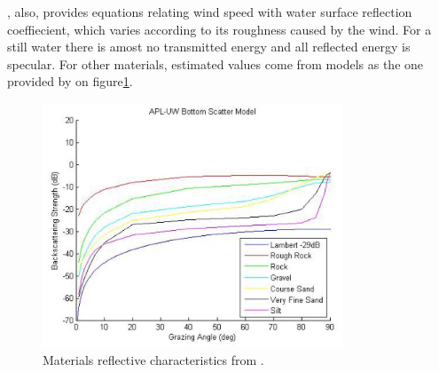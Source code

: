 \citet{Etter2013}, also, provides equations relating wind speed with water
surface reflection coeffiecient, which varies according to its roughness caused
by the wind. For a still water there is amost no transmitted energy and all
reflected energy is specular. For other materials, estimated values come from
models as the one provided by \citet{miller2015real} on
figure\ref{fig:materials}.

\begin{figure}[h]
	\centering
	\includegraphics[width=0.8\textwidth]{Chap2/fig/materials}
	\caption{Materials reflective characteristics from \citet{miller2015real}.}
	\label{fig:materials}
\end{figure}
